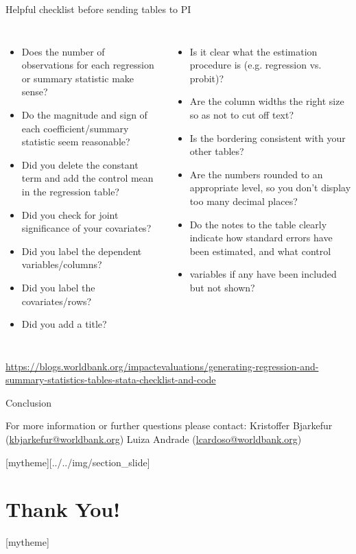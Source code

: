 \documentclass[aspectratio=169]{beamer}
\newcommand{\sectionpic}[2]{
	\setbeamertemplate{section page}[mytheme][#2]
	\section{#1}
	\setbeamertemplate{section page}[mytheme]
}
\begin{document}
\begin{frame}[fragile]{Helpful checklist before sending tables to PI}
	\begin{columns}[t]
		\begin{itemize}
			\item \scriptsize Does the number of observations for each regression or summary statistic make sense?
			\item \scriptsize Do the magnitude and sign of each coefficient/summary statistic seem reasonable?
			\item \scriptsize Did you delete the constant term and add the control mean in the regression table?
			\item \scriptsize Did you check for joint significance of your covariates?
			\item \scriptsize Did you label the dependent variables/columns?
			\item \scriptsize Did you label the covariates/rows?
			\item \scriptsize Did you add a title?
		\end{itemize}
		\begin{itemize}
			\item \scriptsize Is it clear what the estimation procedure is (e.g. regression vs. probit)?
			\item \scriptsize Are the column widths the right size so as not to cut off text?
			\item \scriptsize Is the bordering consistent with your other tables?
			\item \scriptsize Are the numbers rounded to an appropriate level, so you don’t display too many decimal places?
			\item \scriptsize Do the notes to the table clearly indicate how standard errors have been estimated, and what control \item variables if any have been included but not shown?
		\end{itemize}
	\end{columns}
	\vspace{.1cm}
	\scriptsize  \url{https://blogs.worldbank.org/impactevaluations/generating-regression-and-summary-statistics-tables-stata-checklist-and-code}
\end{frame}

\begin{frame}{Conclusion}


\vspace{20mm}
For more information or further questions please contact:
\newline Kristoffer Bjarkefur (\url{kbjarkefur@worldbank.org}) \newline Luiza Andrade (\url{lcardoso@worldbank.org})

\end{frame}

\sectionpic{Thank You!}{../../img/section_slide}
\end{document}
